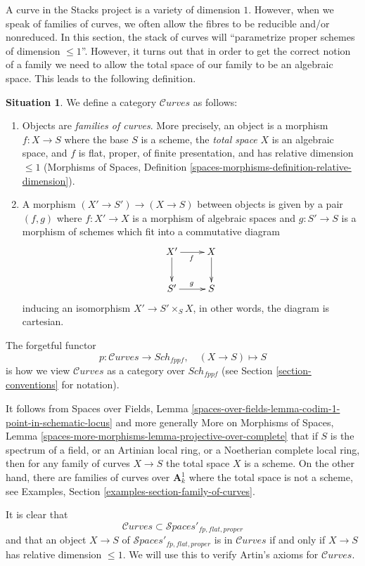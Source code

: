 \documentclass{stacks-project}
\theoremstyle{plain}
\theoremstyle{definition}
\newtheorem{situation}[subsection]{Situation}
\theoremstyle{remark}
\numberwithin{equation}{subsection}
\def\Sch{\mathit{Sch}}
\def\Spacesstack{\mathcal{S}\!\mathit{paces}}
\def\Curvesstack{\mathcal{C}\!\mathit{urves}}
\begin{document}
\medskip\noindent
A curve in the Stacks project is a variety of dimension $1$.
However, when we speak of families of curves, we often allow
the fibres to be reducible and/or nonreduced. In this section,
the stack of curves will ``parametrize proper schemes of
dimension $\leq 1$''. However, it turns out that in order
to get the correct notion of a family we need to allow the
total space of our family to be an algebraic space.
This leads to the following definition.

\begin{situation}
\label{situation-curves}
We define a category $\Curvesstack$ as follows:
\begin{enumerate}
\item Objects are {\it families of curves}. More precisely, an
object is a morphism $f : X \to S$ where the base $S$ is a scheme,
the {\it total space} $X$ is an algebraic space, and
$f$ is flat, proper, of finite presentation,
and has relative dimension $\leq 1$ (Morphisms of Spaces, Definition
\ref{spaces-morphisms-definition-relative-dimension}).
\item A morphism $(X' \to S') \to (X \to S)$ between objects
is given by a pair $(f, g)$ where $f : X' \to X$ is a morphism
of algebraic spaces and $g : S' \to S$ is a morphism of schemes
which fit into a commutative diagram
$$
\xymatrix{
X' \ar[d] \ar[r]_f & X \ar[d] \\
S' \ar[r]^g & S
}
$$
inducing an isomorphism $X' \to S' \times_S X$, in other words, the
diagram is cartesian.
\end{enumerate}
The forgetful functor
$$
p : \Curvesstack \longrightarrow \Sch_{fppf},\quad
(X \to S) \longmapsto S
$$
is how we view $\Curvesstack$ as a category over $\Sch_{fppf}$
(see Section \ref{section-conventions} for notation).
\end{situation}

\noindent
It follows from Spaces over Fields, Lemma
\ref{spaces-over-fields-lemma-codim-1-point-in-schematic-locus}
and more generally
More on Morphisms of Spaces, Lemma
\ref{spaces-more-morphisms-lemma-projective-over-complete}
that if $S$ is the spectrum of a field, or an Artinian local ring,
or a Noetherian complete local ring, then for any family of curves
$X \to S$ the total space $X$ is a scheme.
On the other hand, there are families of curves
over $\mathbf{A}^1_k$ where the total space is not a scheme, see
Examples, Section \ref{examples-section-family-of-curves}.

\medskip\noindent
It is clear that
\begin{equation}
\label{equation-curves-over-proper-spaces}
\Curvesstack \subset \Spacesstack'_{fp, flat, proper}
\end{equation}
and that an object $X \to S$ of $\Spacesstack'_{fp, flat, proper}$
is in $\Curvesstack$ if and only if $X \to S$ has relative
dimension $\leq 1$. We will use this to verify Artin's axioms
for $\Curvesstack$.
\end{document}
